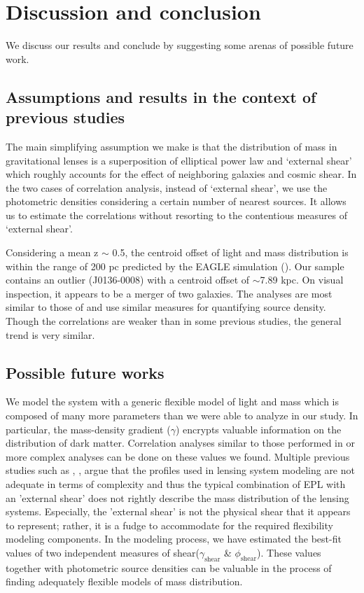 \documentclass{aa}
\begin{document}
\section{Discussion and conclusion} \label{sec:discussion}


We discuss our results and conclude by suggesting some arenas of possible future work.

\subsection{Assumptions and results in the context of previous studies}
The main simplifying assumption we make is that the distribution of mass in gravitational lenses is a superposition of elliptical power law and `external shear' which roughly accounts for the effect of neighboring galaxies and cosmic shear. In the two cases of correlation analysis, instead of `external shear', we use the photometric densities considering a certain number of nearest sources. It allows us to estimate the correlations without resorting to the contentious measures of `external shear'.

Considering a mean z $\sim$ 0.5,  the centroid offset of light and mass distribution is within the range of 200 pc predicted by the EAGLE simulation (\cite{Schaller15}). Our sample contains an outlier (J0136-0008) with a centroid offset of $\sim$7.89 kpc. On visual inspection, it appears to be a merger of two galaxies. The analyses are most similar to those of \cite{Treu09} and use similar measures for quantifying source density. Though the correlations are weaker than in some previous studies, the general trend is very similar.

\subsection{Possible future works}
We model the system with a generic flexible model of light and mass which is composed of many more parameters than we were able to analyze in our study. In particular, the mass-density gradient ($\gamma$) encrypts valuable information on the distribution of dark matter. Correlation analyses similar to those performed in \cite{Treu09} or more complex analyses can be done on these values we found. Multiple previous studies such as \cite{Etherington23}, \cite{VandeVyvere22}, \cite{VandeVyvere22b} argue that the profiles used in lensing system modeling are not adequate in terms of complexity and thus the typical combination of EPL with an 'external shear' does not rightly describe the mass distribution of the lensing systems. Especially, the 'external shear' is not the physical shear that it appears to represent; rather, it is a fudge to accommodate for the required flexibility modeling components. In the modeling process, we have estimated the best-fit values of two independent measures of shear($\gamma_\text{shear}$  &  $\phi_\text{shear}$). These values together with photometric source densities can be valuable in the process of finding adequately flexible models of mass distribution.
\end{document}

